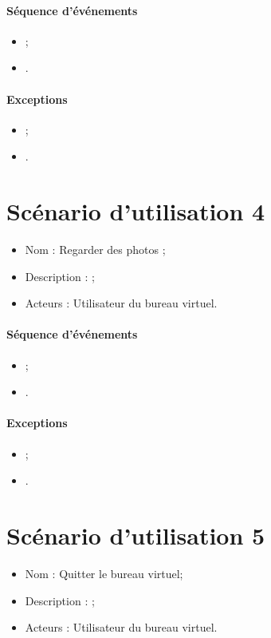 \paragraph{Séquence d'événements}
\begin{itemize}
	\item ;
	\item .
\end{itemize}

\paragraph{Exceptions}
\begin{itemize}
	\item ;
	\item .
\end{itemize}


\section{Scénario d'utilisation 4}
\begin{itemize}
	\item Nom : Regarder des photos ;
	\item Description :  ;
	\item Acteurs : Utilisateur du bureau virtuel.
\end{itemize}

\paragraph{Séquence d'événements}
\begin{itemize}
	\item ;
	\item .
\end{itemize}

\paragraph{Exceptions}
\begin{itemize}
	\item ;
	\item .
\end{itemize}


\section{Scénario d'utilisation 5}
\begin{itemize}
	\item Nom : Quitter le bureau virtuel;
	\item Description :  ;
	\item Acteurs : Utilisateur du bureau virtuel.
\end{itemize}


